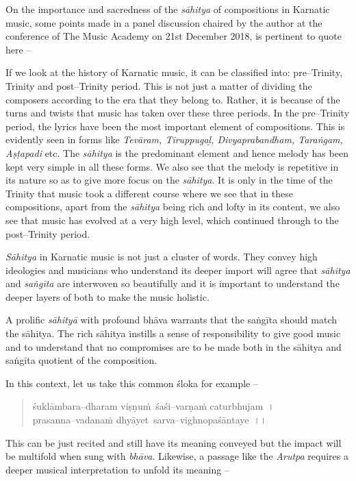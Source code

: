 On the importance and sacredness of the \textit{sāhitya} of compositions in Karnatic music, some points made in a panel discussion chaired by the author at the conference of The Music Academy on 21st December 2018, is pertinent to quote here –

\item If we look at the history of Karnatic music, it can be classified into: pre–Trinity, Trinity and post–Trinity period. This is not just a matter of dividing the composers according to the era that they belong to. Rather, it is because of the turns and twists that music has taken over these three periods. In the pre–Trinity period, the lyrics have been the most important element of compositions. This is evidently seen in forms like \textit{Tevāram, Tiruppugaḻ, Divyaprabandham, Taraṅgam, Aṣṭapadi} etc. The \textit{sāhitya} is the predominant element and hence melody has been kept very simple in all these forms. We also see that the melody is repetitive in its nature so as to give more focus on the \textit{sāhitya}. It is only in the time of the Trinity that music took a different course where we see that in these compositions, apart from the \textit{sāhitya} being rich and lofty in its content, we also see that music has evolved at a very high level, which continued through to the post–Trinity period.

 \item \textit{Sāhitya} in Karnatic music is not just a cluster of words. They convey high ideologies and musicians who understand its deeper import will agree that \textit{sāhitya} and \textit{saṅgīta} are interwoven so beautifully and it is important to understand the deeper layers of both to make the music holistic.

 \item A prolific \textit{sāhityā} with profound bhāva warrants that the saṅgīta should match the sāhitya. The rich sāhitya instills a sense of responsibility to give good music and to understand that no compromises are to be made both in the sāhitya and saṅgīta quotient of the composition.

In this context, let us take this common śloka for example –

\begin{verse}
śuklāmbara–dharam viṣṇuṁ śaśi–varṇaṁ caturbhujam~।\\ prasanna–vadanaṁ dhyāyet sarva–vighnopaśāntaye~।। 
\end{verse}

This can be just recited and still have its meaning conveyed but the impact will be multifold when sung with \textit{bhāva}. Likewise, a passage like the \textit{Arutpa} requires a deeper musical interpretation to unfold its meaning –

